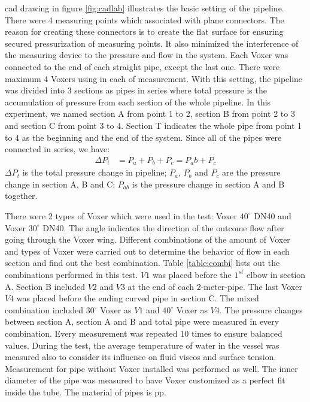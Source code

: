 \gls{cad} drawing in figure \vref{fig:cadlab} illustrates the basic setting of the pipeline. There were 4 measuring points which associated with plane connectors. The reason for creating these connectors is to create the flat surface for ensuring secured pressurization of measuring points. It also minimized the interference of the measuring device to the pressure and flow in the system. Each Voxer was connected to the end of each straight pipe, except the last one. There were maximum 4 Voxers using in each of measurement. With this setting, the pipeline was divided into 3 sections as pipes in series where total pressure is the accumulation of pressure from each section of the whole pipeline. In this experiment, we named section A from point 1 to 2, section B from point 2 to 3 and section C from point 3 to 4. Section T indicates the whole pipe from point 1 to 4 as the beginning and the end of the system. 
Since all of the pipes were connected in series, we have:
\begin{align}
\Delta P_t&= P_a + P_b + P_c = P_ab + P_c 
\end{align}
$\Delta P_t$ is the total pressure change in pipeline; $P_a$, $P_b$ and $P_c$ are the pressure change in section A, B and C; $P_{ab}$ is the pressure change in section A and B together.

There were 2 types of Voxer which were used in the test: Voxer $40^{\circ}$ DN40 and Voxer $30^{\circ}$ DN40. The angle indicates the direction of the outcome flow after going through the Voxer wing. Different combinations of the amount of Voxer and types of Voxer were carried out to determine the behavior of flow in each section and find out the best combination. 
Table \ref{table:combi} lists out the combinations performed in this test. $V1$ was placed before the $1^{st}$ elbow in section A. Section B included $V2$ and $V3$ at the end of each 2-meter-pipe. The last Voxer $V4$ was placed before the ending curved pipe in section C. The mixed combination included $30^{\circ}$ Voxer as $V1$ and $40^{\circ}$ Voxer as $V4$. The pressure changes between section A, section A and B and total pipe were measured in every combination. Every measurement was repeated 10 times to ensure balanced values. During the test, the average temperature of water in the vessel was measured also to consider its influence on fluid \gls{viscos} and surface tension. Measurement for pipe without Voxer installed was performed as well. The inner diameter of the pipe was measured to have Voxer customized as a perfect fit inside the tube. The material of pipes is \gls{pp}. 

